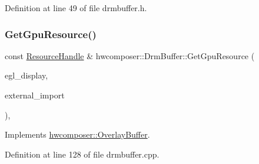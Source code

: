 Definition at line 49 of file drmbuffer.\+h.


\begin{DoxyCode}{0}
\end{DoxyCode}
\mbox{\label{classhwcomposer_1_1DrmBuffer_a7a2a0fe73ce6ef5468c1dc6b3b099d88}} 
\subsubsection{\texorpdfstring{Get\+Gpu\+Resource()}{GetGpuResource()}\hspace{0.1cm}{\footnotesize\ttfamily [1/2]}}
{\footnotesize\ttfamily const \mbox{\hyperlink{namespacehwcomposer_a963c5a1d5902d2d05710dba19af35b48}{Resource\+Handle}} \& hwcomposer\+::\+Drm\+Buffer\+::\+Get\+Gpu\+Resource (\begin{DoxyParamCaption}\item[{\mbox{\hyperlink{namespacehwcomposer_ace90739a34de8ec5b30559423cdef990}{Gpu\+Display}}}]{egl\+\_\+display,  }\item[{bool}]{external\+\_\+import }\end{DoxyParamCaption})\hspace{0.3cm}{\ttfamily [override]}, {\ttfamily [virtual]}}



Implements \mbox{\hyperlink{classhwcomposer_1_1OverlayBuffer_a121d2b77c40a30725d804cee4d2107a5}{hwcomposer\+::\+Overlay\+Buffer}}.



Definition at line 128 of file drmbuffer.\+cpp.


